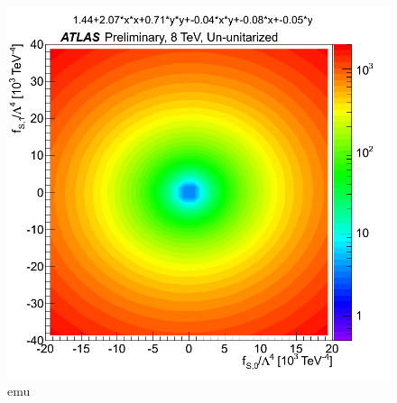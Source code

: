 \begin{figure}[tb]
\centering
\includegraphics[width=.7\textwidth]{figures/aqgc_fits/emu/2l2jUnUnit_emu.png}
\caption{emu}
\label{fig:aqgc_fit_emu_ununit}
\end{figure}

